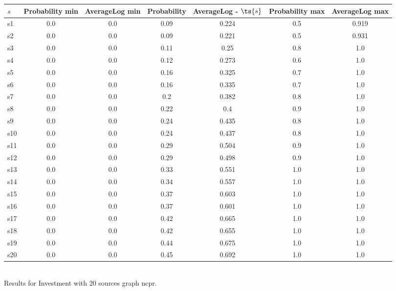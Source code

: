 \documentclass{article}
\begin{document}
\noindent\begin{tabular}{|l|c|c|c|c|c|c|}
\hline
$s$& Probability min & AverageLog min & Probability & AverageLog - $\ts{s}$ & Probability max & AverageLog max\\
\hline
s1 &0.0 & 0.0 & 0.09 & 0.224 & 0.5 & 0.919\\
\hline
s2 &0.0 & 0.0 & 0.09 & 0.221 & 0.5 & 0.931\\
\hline
s3 &0.0 & 0.0 & 0.11 & 0.25 & 0.8 & 1.0\\
\hline
s4 &0.0 & 0.0 & 0.12 & 0.273 & 0.6 & 1.0\\
\hline
s5 &0.0 & 0.0 & 0.16 & 0.325 & 0.7 & 1.0\\
\hline
s6 &0.0 & 0.0 & 0.16 & 0.335 & 0.7 & 1.0\\
\hline
s7 &0.0 & 0.0 & 0.2 & 0.382 & 0.8 & 1.0\\
\hline
s8 &0.0 & 0.0 & 0.22 & 0.4 & 0.9 & 1.0\\
\hline
s9 &0.0 & 0.0 & 0.24 & 0.435 & 0.8 & 1.0\\
\hline
s10 &0.0 & 0.0 & 0.24 & 0.437 & 0.8 & 1.0\\
\hline
s11 &0.0 & 0.0 & 0.29 & 0.504 & 0.9 & 1.0\\
\hline
s12 &0.0 & 0.0 & 0.29 & 0.498 & 0.9 & 1.0\\
\hline
s13 &0.0 & 0.0 & 0.33 & 0.551 & 1.0 & 1.0\\
\hline
s14 &0.0 & 0.0 & 0.34 & 0.557 & 1.0 & 1.0\\
\hline
s15 &0.0 & 0.0 & 0.37 & 0.603 & 1.0 & 1.0\\
\hline
s16 &0.0 & 0.0 & 0.37 & 0.601 & 1.0 & 1.0\\
\hline
s17 &0.0 & 0.0 & 0.42 & 0.665 & 1.0 & 1.0\\
\hline
s18 &0.0 & 0.0 & 0.42 & 0.655 & 1.0 & 1.0\\
\hline
s19 &0.0 & 0.0 & 0.44 & 0.675 & 1.0 & 1.0\\
\hline
s20 &0.0 & 0.0 & 0.45 & 0.692 & 1.0 & 1.0\\
\hline
\end{tabular}\\

\noindent Results for Investment with 20 sources graph ncpr.
\end{document}
